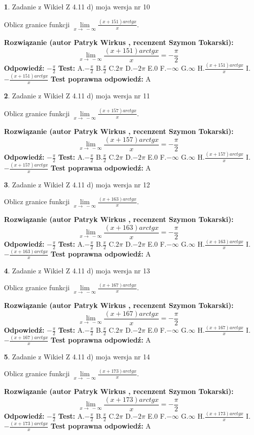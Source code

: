 \documentclass[12pt, a4paper]{article}
\theoremstyle{definition} %
\newtheorem{zad}{}
\newcommand{\zadStart}[1]{\begin{zad}#1\newline}
\newcommand{\zadStop}{\end{zad}}
\newcommand{\rozwStart}[2]{\noindent \textbf{Rozwiązanie (autor #1 , recenzent #2): }\newline}
\newcommand{\rozwStop}{\newline}
\newcommand{\odpStart}{\noindent \textbf{Odpowiedź:}\newline}
\newcommand{\odpStop}{\newline}
\newcommand{\testStart}{\noindent \textbf{Test:}\newline}
\newcommand{\testStop}{\newline}
\newcommand{\kluczStart}{\noindent \textbf{Test poprawna odpowiedź:}\newline}
\newcommand{\kluczStop}{\newline}
\begin{document}
\zadStart{Zadanie z Wikieł Z 4.11 d) moja wersja nr 10}

Oblicz granice funkcji $\lim\limits_{x\to\ -\infty}\frac{(x+151)arctgx}{x}$.
\zadStop
\rozwStart{Patryk Wirkus}{Szymon Tokarski}
$$\lim\limits_{x\to\ -\infty}\frac{(x+151)arctgx}{x} = -\frac{\pi}{2}$$
\rozwStop
\odpStart
$-\frac{\pi}{2}$
\odpStop
\testStart
A.$-\frac{\pi}{2}$ B.$\frac{\pi}{2}$ C.$2\pi$ D.$-2\pi$ E.$0$ F.$-\infty$ G.$\infty$ H.$\frac{(x+151)arctgx}{x}$ I.$-\frac{(x+151)arctgx}{x}$
\testStop
\kluczStart
A
\kluczStop



\zadStart{Zadanie z Wikieł Z 4.11 d) moja wersja nr 11}

Oblicz granice funkcji $\lim\limits_{x\to\ -\infty}\frac{(x+157)arctgx}{x}$.
\zadStop
\rozwStart{Patryk Wirkus}{Szymon Tokarski}
$$\lim\limits_{x\to\ -\infty}\frac{(x+157)arctgx}{x} = -\frac{\pi}{2}$$
\rozwStop
\odpStart
$-\frac{\pi}{2}$
\odpStop
\testStart
A.$-\frac{\pi}{2}$ B.$\frac{\pi}{2}$ C.$2\pi$ D.$-2\pi$ E.$0$ F.$-\infty$ G.$\infty$ H.$\frac{(x+157)arctgx}{x}$ I.$-\frac{(x+157)arctgx}{x}$
\testStop
\kluczStart
A
\kluczStop



\zadStart{Zadanie z Wikieł Z 4.11 d) moja wersja nr 12}

Oblicz granice funkcji $\lim\limits_{x\to\ -\infty}\frac{(x+163)arctgx}{x}$.
\zadStop
\rozwStart{Patryk Wirkus}{Szymon Tokarski}
$$\lim\limits_{x\to\ -\infty}\frac{(x+163)arctgx}{x} = -\frac{\pi}{2}$$
\rozwStop
\odpStart
$-\frac{\pi}{2}$
\odpStop
\testStart
A.$-\frac{\pi}{2}$ B.$\frac{\pi}{2}$ C.$2\pi$ D.$-2\pi$ E.$0$ F.$-\infty$ G.$\infty$ H.$\frac{(x+163)arctgx}{x}$ I.$-\frac{(x+163)arctgx}{x}$
\testStop
\kluczStart
A
\kluczStop



\zadStart{Zadanie z Wikieł Z 4.11 d) moja wersja nr 13}

Oblicz granice funkcji $\lim\limits_{x\to\ -\infty}\frac{(x+167)arctgx}{x}$.
\zadStop
\rozwStart{Patryk Wirkus}{Szymon Tokarski}
$$\lim\limits_{x\to\ -\infty}\frac{(x+167)arctgx}{x} = -\frac{\pi}{2}$$
\rozwStop
\odpStart
$-\frac{\pi}{2}$
\odpStop
\testStart
A.$-\frac{\pi}{2}$ B.$\frac{\pi}{2}$ C.$2\pi$ D.$-2\pi$ E.$0$ F.$-\infty$ G.$\infty$ H.$\frac{(x+167)arctgx}{x}$ I.$-\frac{(x+167)arctgx}{x}$
\testStop
\kluczStart
A
\kluczStop



\zadStart{Zadanie z Wikieł Z 4.11 d) moja wersja nr 14}

Oblicz granice funkcji $\lim\limits_{x\to\ -\infty}\frac{(x+173)arctgx}{x}$.
\zadStop
\rozwStart{Patryk Wirkus}{Szymon Tokarski}
$$\lim\limits_{x\to\ -\infty}\frac{(x+173)arctgx}{x} = -\frac{\pi}{2}$$
\rozwStop
\odpStart
$-\frac{\pi}{2}$
\odpStop
\testStart
A.$-\frac{\pi}{2}$ B.$\frac{\pi}{2}$ C.$2\pi$ D.$-2\pi$ E.$0$ F.$-\infty$ G.$\infty$ H.$\frac{(x+173)arctgx}{x}$ I.$-\frac{(x+173)arctgx}{x}$
\testStop
\kluczStart
A
\kluczStop
\end{document}
